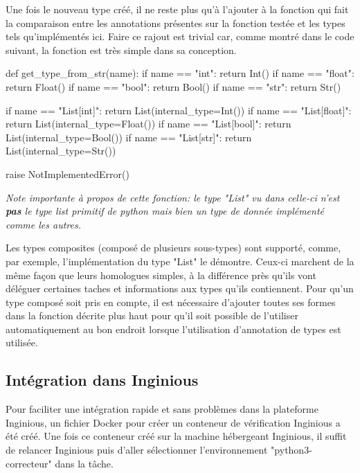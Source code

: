 \documentclass[a4paper]{report}
\begin{document}
Une fois le nouveau type créé, il ne reste plus qu'à l'ajouter à la fonction qui fait la comparaison entre les annotations présentes sur la fonction testée et les types tels qu'implémentés ici.
Faire ce rajout est trivial car, comme montré dans le code suivant, la fonction est très simple dans sa conception.

\begin{python}
def get_type_from_str(name):
    if name == "int":
        return Int()
    if name == "float":
        return Float()
    if name == "bool":
        return Bool()
    if name == "str":
        return Str()

    if name == "List[int]":
        return List(internal_type=Int())
    if name == "List[float]":
        return List(internal_type=Float())
    if name == "List[bool]":
        return List(internal_type=Bool())
    if name == "List[str]":
        return List(internal_type=Str())

    raise NotImplementedError()
\end{python}

\textit{Note importante à propos de cette fonction: le type "List" vu dans celle-ci n'est \textbf{pas} le type list primitif de python mais bien un type de donnée implémenté comme les autres.}

Les types composites (composé de plusieurs sous-types) sont supporté, comme, par exemple, l'implémentation du type "List" le démontre.
Ceux-ci marchent de la même façon que leurs homologues simples, à la différence près qu'ils vont déléguer certaines taches et informations aux types qu'ils contiennent.
Pour qu'un type composé soit pris en compte, il est nécessaire d'ajouter toutes ses formes dans la fonction décrite plus haut pour qu'il soit possible de l'utiliser automatiquement au bon endroit lorsque l'utilisation d'annotation de types est utilisée.




\subsection{Intégration dans Inginious}

Pour faciliter une intégration rapide et sans problèmes dans la plateforme Inginious, un fichier Docker pour créer un conteneur de vérification Inginious a été créé.
Une fois ce conteneur créé sur la machine hébergeant Inginious, il suffit de relancer Inginious puis d'aller sélectionner l'environnement "python3-correcteur" dans la tâche.
\end{document}
